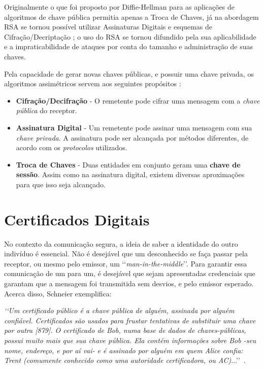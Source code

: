 	Originalmente o que foi proposto por Diffie-Hellman para as aplicações de algoritmos de chave pública permitia apenas a Troca de Chaves, já na abordagem RSA se tornou possível utilizar Assinaturas Digitais \cite[p.~12]{pkcs1} e esquemas de Cifração/Decriptação \cite[p.~15]{pkcs1}; o uso do RSA se tornou difundido pela sua aplicabilidade e a impraticabilidade de ataques por conta do tamanho e administração de suas chaves.
	
	Pela capacidade de gerar novas chaves públicas, e possuir uma chave privada, os algoritmos assimétricos servem aos seguintes propósitos \cite[p.~275]{stallings11}:
	
	\begin{itemize}
		\item \textbf{Cifração/Decifração} - O remetente pode cifrar uma mensagem com a \textit{chave pública} do receptor.
		\item \textbf{Assinatura Digital} - Um remetente pode assinar uma mensagem com sua \textit{chave privada}. A assinatura pode ser alcançada por métodos diferentes, de acordo com os \textit{protocolos} utilizados.
		\item \textbf{Troca de Chaves} - Duas entidades em conjunto geram uma \textbf{chave de sessão}. Assim como na assinatura digital, existem diversas aproximações para que isso seja alcançado. 
	\end{itemize}	

\section[Certificados Digitais]{Certificados Digitais}

	No contexto da comunicação segura, a ideia de saber a identidade do outro indivíduo é essencial. Não é desejável que um desconhecido se faça passar pela receptor, ou mesmo pelo emissor, um \lq\lq\textit{man-in-the-middle}\rq\rq. Para garantir essa comunicação de um para um, é desejável que sejam apresentadas credenciais que garantam que a mensagem foi transmitida sem desvios, e pelo emissor esperado. Acerca disso, Schneier exemplifica:

	\textit{\lq\lq Um certificado público é a chave pública de alguém, assinada por alguém confiável. Certificados são usados para frustar tentativas de substituir uma chave por outra [879]. O certificado de Bob, numa base de dados de chaves-públicas, possui muito mais que sua chave pública. Ela contém informações sobre Bob -seu nome, endereço, e por aí vai- e é assinado por alguém em quem Alice confia: Trent (comumente conhecido como uma autoridade certificadora, ou AC)}...\rq\rq\ \cite[p.~163, com adaptações]{schneier96}.

